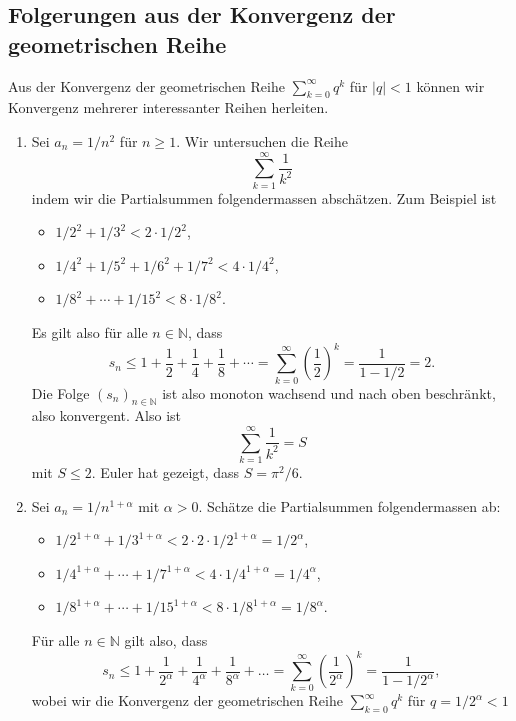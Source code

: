 \documentclass[../main.tex]{subfiles}
\begin{document}
\subsection*{Folgerungen aus der Konvergenz der
geometrischen Reihe}
Aus der Konvergenz der geometrischen Reihe
$\sum_{k=0}^{\infty} q^k$ für $|q|<1$
können wir Konvergenz mehrerer interessanter
Reihen herleiten.
\begin{enumerate}[(1)]
  \item Sei $a_n = 1/n^2$ für $n \geq 1$. Wir untersuchen die Reihe
    \[
      \sum_{k=1}^{\infty} \frac{1}{k^2}
    \]
    indem wir die Partialsummen folgendermassen abschätzen.
    Zum Beispiel ist
    \begin{itemize}
      \item $1/2^2 + 1/3^2 < 2 \cdot 1/2^2$,
      \item $1/4^2 + 1/5^2 + 1/6^2 + 1/7^2 < 4 \cdot 1/4^2$,
      \item $1/8^2 + \cdots + 1/15^2 < 8 \cdot 1/8^2$.
    \end{itemize}
    Es gilt also für alle $n \in \mathbb{N}$, dass
    \[
      s_n \leq 1 + \frac{1}{2} + \frac{1}{4} + \frac{1}{8} + \cdots
      = \sum_{k=0}^{\infty} {\left( \frac{1}{2} \right)}^k
      = \frac{1}{1-1/2} = 2.
    \]
    Die Folge ${(s_{n})}_{n \in \mathbb{N}}$ ist also
    monoton wachsend und nach oben beschränkt, also
    konvergent. Also ist
    \[
      \sum_{k=1}^{\infty} \frac{1}{k^2} = S
    \]
    mit $S \leq 2$. Euler hat gezeigt, dass $S = \pi^2/6$.
  \item Sei $a_n = 1/n^{1 + \alpha}$ mit $\alpha > 0$.
    Schätze die Partialsummen folgendermassen ab:
    \begin{itemize}
      \item $1/2^{1 + \alpha} + 
        1/3^{1 + \alpha}< 2 \cdot 2 \cdot 1/2^{1+\alpha}
        = 1/2^\alpha$,
      \item $1/4^{1 + \alpha} + \cdots + 1/7^{1+ \alpha}
        < 4 \cdot 1/4^{1 + \alpha} = 1/4^\alpha$,
      \item $1/8^{1 + \alpha} + \cdots + 1/15^{1 + \alpha}
        < 8 \cdot 1 /8^{1 + \alpha} = 1/8^{\alpha}$.
    \end{itemize}
    Für alle $n \in \mathbb{N}$ gilt also, dass
    \[
      s_n \leq 1 + \frac{1}{2^{\alpha}} + \frac{1}{4^{\alpha}}
      + \frac{1}{8^{\alpha}} + \dots
      = \sum_{k=0}^{\infty} 
      {\left( \frac{1}{2^{\alpha}} \right)}^k
      = \frac{1}{1-1/2^{\alpha}},
    \]
    wobei wir die Konvergenz der geometrischen Reihe
    $\sum_{k=0}^{\infty} q^k$ für $q = 1/2^\alpha < 1$

\end{enumerate}
\end{document}
